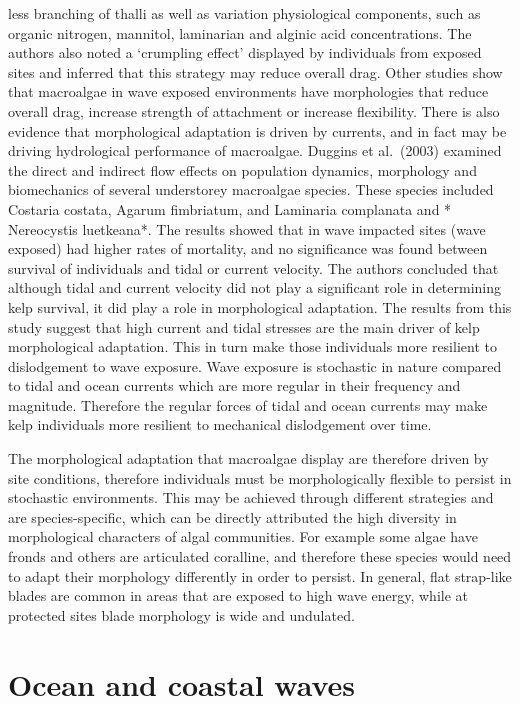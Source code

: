 \documentclass[]{article}
\begin{document}
less branching of thalli as well as variation physiological components,
such as organic nitrogen, mannitol, laminarian and alginic acid
concentrations. The authors also noted a `crumpling eﬀect' displayed by
individuals from exposed sites and inferred that this strategy may
reduce overall drag. Other studies show that macroalgae in wave exposed
environments have morphologies that reduce overall drag, increase
strength of attachment or increase flexibility. There is also evidence
that morphological adaptation is driven by currents, and in fact may be
driving hydrological performance of macroalgae. Duggins et al.~(2003)
examined the direct and indirect flow eﬀects on population dynamics,
morphology and biomechanics of several understorey macroalgae species.
These species included Costaria costata, Agarum fimbriatum, and
Laminaria complanata and * Nereocystis luetkeana*. The results showed
that in wave impacted sites (wave exposed) had higher rates of
mortality, and no significance was found between survival of individuals
and tidal or current velocity. The authors concluded that although tidal
and current velocity did not play a significant role in determining kelp
survival, it did play a role in morphological adaptation. The results
from this study suggest that high current and tidal stresses are the
main driver of kelp morphological adaptation. This in turn make those
individuals more resilient to dislodgement to wave exposure. Wave
exposure is stochastic in nature compared to tidal and ocean currents
which are more regular in their frequency and magnitude. Therefore the
regular forces of tidal and ocean currents may make kelp individuals
more resilient to mechanical dislodgement over time.

The morphological adaptation that macroalgae display are therefore
driven by site conditions, therefore individuals must be morphologically
flexible to persist in stochastic environments. This may be achieved
through different strategies and are species-specific, which can be
directly attributed the high diversity in morphological characters of
algal communities. For example some algae have fronds and others are
articulated coralline, and therefore these species would need to adapt
their morphology differently in order to persist. In general, flat
strap-like blades are common in areas that are exposed to high wave
energy, while at protected sites blade morphology is wide and undulated.

\hypertarget{ocean-and-coastal-waves}{%
\section{Ocean and coastal waves}\label{ocean-and-coastal-waves}}
\end{document}
